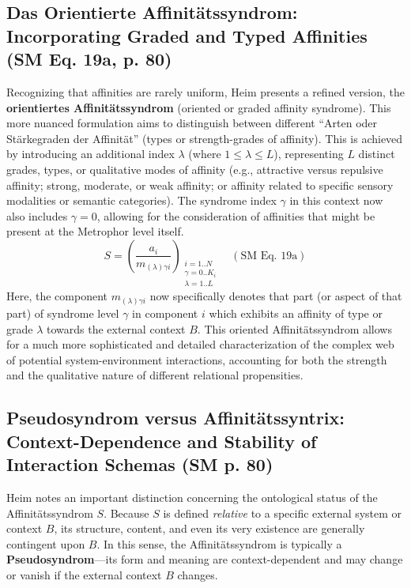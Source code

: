 \documentclass[
    12pt,              %
    a4paper,           %
    headings=normal,   %
    twoside=true,      %
    BCOR=8mm,          %
]{scrbook}
\newcommand{\q}[1]{\enquote{#1}}
\newcommand{\affinitaetssyndrom}{S}
\begin{document}
\subsection{Das Orientierte Affinitätssyndrom: Incorporating Graded and Typed Affinities (SM Eq. 19a, p. 80)}
\label{sec:ch4_aff_graded_revised_2}

Recognizing that affinities are rarely uniform, Heim presents a refined version, the \textbf{orientiertes Affinitätssyndrom} (oriented or graded affinity syndrome). This more nuanced formulation aims to distinguish between different \q{Arten oder Stärkegraden der Affinität} (types or strength-grades of affinity). This is achieved by introducing an additional index \(\lambda\) (where \(1 \le \lambda \le L\)), representing \(L\) distinct grades, types, or qualitative modes of affinity (e.g., attractive versus repulsive affinity; strong, moderate, or weak affinity; or affinity related to specific sensory modalities or semantic categories). The syndrome index \(\gamma\) in this context now also includes \(\gamma=0\), allowing for the consideration of affinities that might be present at the Metrophor level itself.
\begin{equation} \label{eq:original_affinitaetssyndrom_oriented_revised_2} 
\affinitaetssyndrom = \left( \frac{a_i}{m_{(\lambda)\gamma i}} \right)_{\substack{i=1..N \\ \gamma=0..K_i \\ \lambda=1..L}} \quad (\text{SM Eq. 19a})
\end{equation}
Here, the component \(m_{(\lambda)\gamma i}\) now specifically denotes that part (or aspect of that part) of syndrome level \(\gamma\) in component \(i\) which exhibits an affinity of type or grade \(\lambda\) towards the external context \(B\). This oriented Affinitätssyndrom allows for a much more sophisticated and detailed characterization of the complex web of potential system-environment interactions, accounting for both the strength and the qualitative nature of different relational propensities.

\subsection{Pseudosyndrom versus Affinitätssyntrix: Context-Dependence and Stability of Interaction Schemas (SM p. 80)}
\label{sec:ch4_aff_pseudosyndrom_revised_2}

Heim notes an important distinction concerning the ontological status of the Affinitätssyndrom \(\affinitaetssyndrom\). Because \(\affinitaetssyndrom\) is defined \textit{relative} to a specific external system or context \(B\), its structure, content, and even its very existence are generally contingent upon \(B\). In this sense, the Affinitätssyndrom is typically a \textbf{Pseudosyndrom}—its form and meaning are context-dependent and may change or vanish if the external context \(B\) changes.
\end{document}
